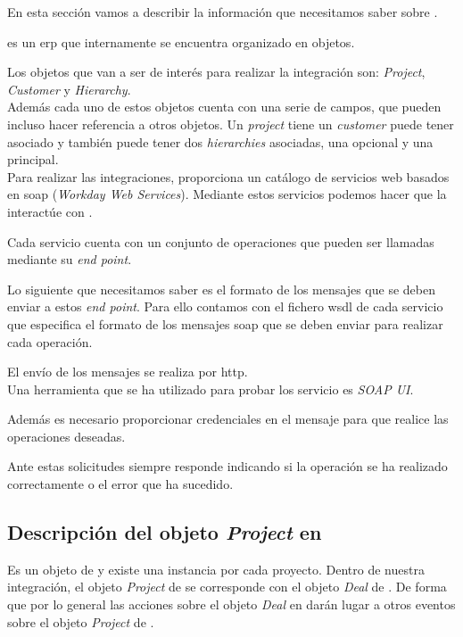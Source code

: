 En esta sección vamos a describir la información que necesitamos saber sobre \wday.

\wday{} es un \acrshort{erp} que internamente se encuentra organizado en objetos.
 
Los objetos que van a ser de interés para realizar la integración son:
\textit{Project}, \textit{Customer} y \textit{Hierarchy}.\\

Además cada uno de estos objetos cuenta con una serie de campos, que pueden incluso hacer referencia a otros objetos.
Un \textit{project} tiene un \textit{customer} puede tener asociado y también puede tener dos \textit{hierarchies} asociadas, una opcional y una principal.\\


Para realizar las integraciones, \wday{} proporciona un catálogo de servicios web basados en \acrshort{soap} (\textit{Workday Web Services}). 
Mediante estos servicios podemos hacer que la \iface{} interactúe con \wday{}.

Cada servicio cuenta con un conjunto de operaciones que pueden ser llamadas mediante su \textit{end point}.


Lo siguiente que necesitamos saber es el formato de los mensajes que se deben enviar a estos \textit{end point}. Para ello contamos con el fichero \acrshort{wsdl} de cada servicio que especifica el formato de los mensajes \acrshort{soap} que se deben enviar para realizar cada operación.


El envío de los mensajes se realiza por \acrshort{http}.\\

Una herramienta que se ha utilizado para probar los servicio es \textit{SOAP UI}.

Además es necesario proporcionar credenciales en el mensaje para que \wday{} realice las operaciones deseadas.

Ante estas solicitudes \wday{} siempre responde indicando si la operación se ha realizado correctamente o el error que ha sucedido.



\subsection{Descripción del objeto \textit{Project} en \wday{}}
Es un objeto de \wday{} y existe una instancia por cada proyecto. Dentro de nuestra integración, 
el objeto \textit{Project} de \wday{} se corresponde con el objeto \textit{Deal} de \hs{}. 
De forma que por lo general las acciones sobre el objeto \textit{Deal} en \hs{} darán lugar a otros eventos
 sobre el objeto \textit{Project} de \wday{}.\\
 
